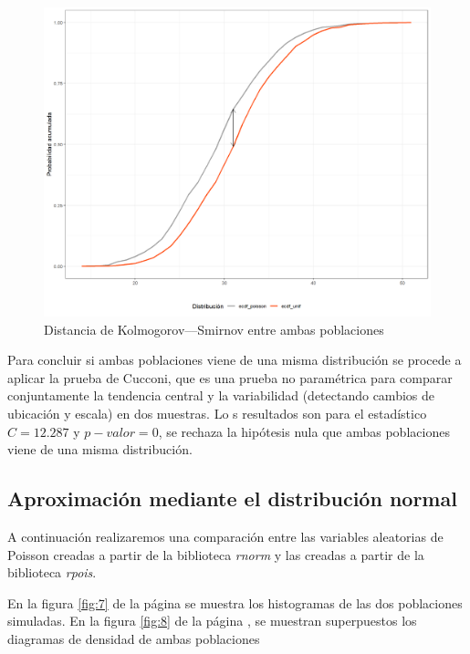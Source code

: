 \documentclass{article}
\begin{document}
\begin{center}
\begin{figure}
\includegraphics[scale=0.6]{figuras/distanciaKolmPU.png}
\caption{Distancia de Kolmogorov–--Smirnov entre ambas poblaciones}
\label{fig:6}
\end{figure}
\end{center}
 Para concluir si ambas poblaciones viene de una misma distribución se procede a aplicar la prueba de Cucconi, que es una prueba no paramétrica para comparar conjuntamente la tendencia central y la variabilidad (detectando cambios de ubicación y escala) en dos muestras. Lo s resultados son para el estadístico $C = 12.287$ y $p-valor = 0$, se rechaza la hipótesis nula que ambas poblaciones viene de una misma distribución.
 
 \subsection{Aproximación mediante el distribución normal}

A continuación realizaremos una comparación entre las variables aleatorias de Poisson creadas a partir de la biblioteca \textit{rnorm} y las creadas a partir de la biblioteca \textit{rpois}.

En la figura \ref{fig:7} de la página \pageref{fig:7} se muestra los histogramas de las dos poblaciones simuladas. En la figura \ref{fig:8} de la página \pageref{fig:8}, se muestran superpuestos los diagramas de densidad de ambas poblaciones 
\end{document}
